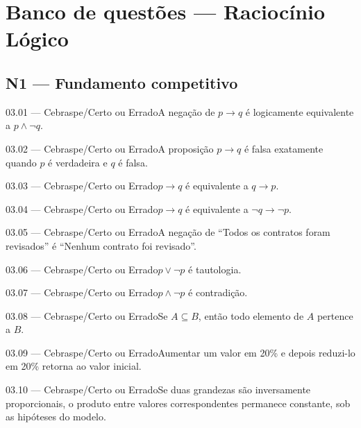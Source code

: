 \section{Banco de questões — Raciocínio Lógico}

\subsection*{N1 — Fundamento competitivo}
\begin{questao}{ 03.01 — Cebraspe/Certo ou Errado}A negação de $p\to q$ é logicamente equivalente a $p\land\neg q$.\end{questao}
\begin{questao}{ 03.02 — Cebraspe/Certo ou Errado}A proposição $p\to q$ é falsa exatamente quando $p$ é verdadeira e $q$ é falsa.\end{questao}
\begin{questao}{ 03.03 — Cebraspe/Certo ou Errado}$p\to q$ é equivalente a $q\to p$.\end{questao}
\begin{questao}{ 03.04 — Cebraspe/Certo ou Errado}$p\to q$ é equivalente a $\neg q\to\neg p$.\end{questao}
\begin{questao}{ 03.05 — Cebraspe/Certo ou Errado}A negação de ``Todos os contratos foram revisados'' é ``Nenhum contrato foi revisado''.\end{questao}
\begin{questao}{ 03.06 — Cebraspe/Certo ou Errado}$p\lor\neg p$ é tautologia.\end{questao}
\begin{questao}{ 03.07 — Cebraspe/Certo ou Errado}$p\land\neg p$ é contradição.\end{questao}
\begin{questao}{ 03.08 — Cebraspe/Certo ou Errado}Se $A\subseteq B$, então todo elemento de $A$ pertence a $B$.\end{questao}
\begin{questao}{ 03.09 — Cebraspe/Certo ou Errado}Aumentar um valor em 20\% e depois reduzi-lo em 20\% retorna ao valor inicial.\end{questao}
\begin{questao}{ 03.10 — Cebraspe/Certo ou Errado}Se duas grandezas são inversamente proporcionais, o produto entre valores correspondentes permanece constante, sob as hipóteses do modelo.\end{questao}

